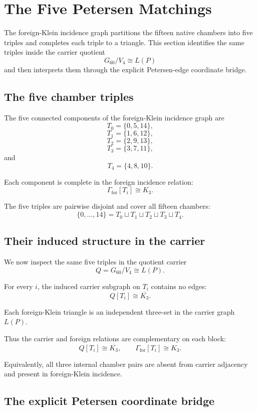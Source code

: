 \section{The Five Petersen Matchings}

The foreign-Klein incidence graph partitions the fifteen native
chambers into five triples and completes each triple to a triangle.
This section identifies the same triples inside the carrier quotient
\[
G_{60}/V_4\cong L(P)
\]
and then interprets them through the explicit Petersen-edge coordinate
bridge.

\subsection{The five chamber triples}

The five connected components of the foreign-Klein incidence graph are
\[
T_0=\{0,5,14\},
\]
\[
T_1=\{1,6,12\},
\]
\[
T_2=\{2,9,13\},
\]
\[
T_3=\{3,7,11\},
\]
and
\[
T_4=\{4,8,10\}.
\]

Each component is complete in the foreign incidence relation:
\[
\Gamma_{\mathrm{for}}[T_i]\cong K_3.
\]

The five triples are pairwise disjoint and cover all fifteen chambers:
\[
\{0,\ldots,14\}
=
T_0\sqcup T_1\sqcup T_2\sqcup T_3\sqcup T_4.
\]

\subsection{Their induced structure in the carrier}

We now inspect the same five triples in the quotient carrier
\[
Q=G_{60}/V_4\cong L(P).
\]

For every \(i\), the induced carrier subgraph on \(T_i\) contains no
edges:
\[
Q[T_i]\cong\overline{K_3}.
\]

\begin{theorem}
Each foreign-Klein triangle is an independent three-set in the carrier
graph \(L(P)\).
\end{theorem}

Thus the carrier and foreign relations are complementary on each
block:
\[
Q[T_i]\cong\overline{K_3},
\qquad
\Gamma_{\mathrm{for}}[T_i]\cong K_3.
\]

Equivalently, all three internal chamber pairs are absent from carrier
adjacency and present in foreign-Klein incidence.

\subsection{The explicit Petersen coordinate bridge}

